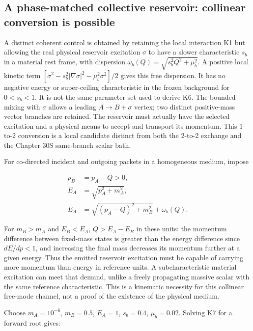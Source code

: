 \documentclass[
  11pt,
  twoside]{article}
\begin{document}
\subsection{A phase-matched collective reservoir: collinear conversion
is
possible}\label{a-phase-matched-collective-reservoir-collinear-conversion-is-possible}

A distinct coherent control is obtained by retaining the local
interaction K1 but allowing the real physical reservoir excitation
\(\sigma\) to have a slower characteristic \(s_b\) in a material rest
frame, with dispersion \(\omega_b(Q)=\sqrt{s_b^2 Q^2+\mu_b^2}\). A
positive local kinetic term
\([\dot\sigma^2-s_b^2|\nabla\sigma|^2-\mu_b^2\sigma^2]/2\) gives this
free dispersion. It has no negative energy or super-ceiling
characteristic in the frozen background for \(0<s_b<1\). It is not the
same parameter set used to derive K6. The bounded mixing with \(\sigma\)
allows a leading \(A\to B+\sigma\) vertex; two distinct positive-mass
vector branches are retained. The reservoir must actually have the
selected excitation and a physical means to accept and transport its
momentum. This 1-to-2 conversion is a local candidate distinct from both
the 2-to-2 exchange and the Chapter 30S same-branch scalar bath.

For co-directed incident and outgoing packets in a homogeneous medium,
impose

\[\begin{aligned}
p_B&=p_A-Q>0,\\
E_A&=\sqrt{p_A^2+m_A^2},\\
E_A&=\sqrt{(p_A-Q)^2+m_B^2}+\omega_b(Q).
\end{aligned}\tag{K7}\]

For \(m_B>m_A\) and \(E_B<E_A\), \(Q> E_A-E_B\) in these units: the
momentum difference between fixed-mass states is greater than the energy
difference since \(dE/dp<1\), and increasing the final mass decreases
its momentum further at a given energy. Thus the emitted reservoir
excitation must be capable of carrying more momentum than energy in
reference units. A subcharacteristic material excitation can meet that
demand, unlike a freely propagating massive scalar with the same
reference characteristic. This is a kinematic necessity for this
collinear free-mode channel, not a proof of the existence of the
physical medium.

Choose \(m_A=10^{-6}\), \(m_B=0.5\), \(E_A=1\), \(s_b=0.4\),
\(\mu_b=0.02\). Solving K7 for a forward root gives:
\end{document}
